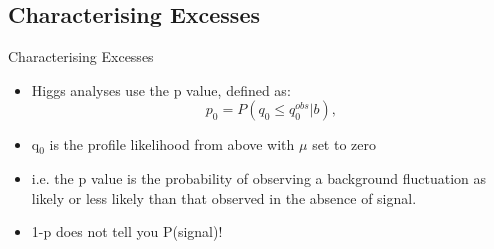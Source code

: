 \documentclass{beamer}
\begin{document}
\begin{frame}
\begin{figure}
  \end{figure}
\end{frame}


\subsection{Characterising Excesses}
\begin{frame}{Characterising Excesses}
  \begin{itemize}
  \item Higgs analyses use the  p value, defined as:
      \begin{equation*}
        p_{0} = P(q_{0} \leqslant q_{0}^{obs}|b),
      \end{equation*}
      \item q$_{0}$ is the profile likelihood from above with $\mu$ set to zero
      \item i.e. the p value is the probability of observing a background fluctuation as likely or less likely than that observed in the absence of signal.
      \item 1-p does not tell you P(signal)!
  \end{itemize}
\end{frame}
\end{document}
